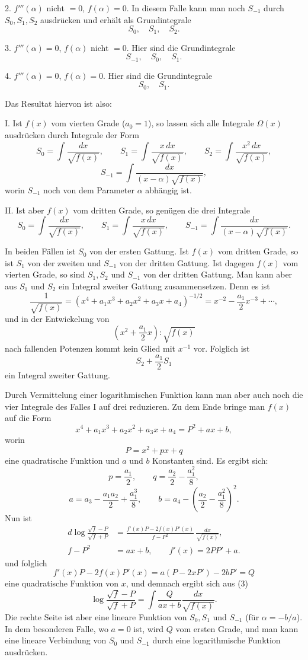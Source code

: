 \documentclass[11pt]{article}
\begin{document}
2. $f'''(\alpha)$ nicht $=0$, $f(\alpha)=0$. In diesem Falle kann man noch $S_{-1}$ durch $S_0,S_1,S_2$ ausdrücken und erhält als Grundintegrale
\[
S_0,\quad S_1,\quad S_2.
\]

3. $f'''(\alpha)=0$, $f(\alpha)$ nicht $=0$. Hier sind die Grundintegrale
\[
S_{-1},\quad S_0,\quad S_1.
\]

4. $f'''(\alpha)=0$, $f(\alpha)=0$. Hier sind die Grundintegrale
\[
S_0,\quad S_1.
\]

Das Resultat hiervon ist also:

I. Ist $f(x)$ vom vierten Grade ($a_0=1$), so lassen sich alle Integrale $\Omega(x)$ ausdrücken durch Integrale der Form
\[
S_0=\int\frac{dx}{\sqrt{f(x)}},\qquad
S_1=\int\frac{x\,dx}{\sqrt{f(x)}},\qquad
S_2=\int\frac{x^2\,dx}{\sqrt{f(x)}},
\]
\[
S_{-1}=\int\frac{dx}{(x-\alpha)\sqrt{f(x)}},
\]
worin $S_{-1}$ noch von dem Parameter $\alpha$ abhängig ist.

II. Ist aber $f(x)$ vom dritten Grade, so genügen die drei Integrale
\[
S_0=\int\frac{dx}{\sqrt{f(x)}},\qquad
S_1=\int\frac{x\,dx}{\sqrt{f(x)}},\qquad
S_{-1}=\int\frac{dx}{(x-\alpha)\sqrt{f(x)}}.
\]

In beiden Fällen ist $S_0$ von der ersten Gattung. Ist $f(x)$ vom dritten Grade, so ist $S_1$ von der zweiten und $S_{-1}$ von der dritten Gattung. Ist dagegen $f(x)$ vom vierten Grade, so sind $S_1,S_2$ und $S_{-1}$ von der dritten Gattung. Man kann aber aus $S_1$ und $S_2$ ein Integral zweiter Gattung zusammensetzen. Denn es ist
\[
\frac1{\sqrt{f(x)}}=(x^4+a_1x^3+a_2x^2+a_3x+a_4)^{-1/2}
=x^{-2}-\frac{a_1}{2}x^{-3}+\cdots,
\]
und in der Entwickelung von
\[
\left(x^2+\frac{a_1}{2}x\right):\sqrt{f(x)}
\]
nach fallenden Potenzen kommt kein Glied mit $x^{-1}$ vor. Folglich ist
\[
S_2+\frac{a_1}{2}S_1
\]
ein Integral zweiter Gattung.

Durch Vermittelung einer logarithmischen Funktion kann man aber auch noch die vier Integrale des Falles I auf drei reduzieren. Zu dem Ende bringe man $f(x)$ auf die Form
\[
x^4+a_1x^3+a_2x^2+a_3x+a_4=P^2+ax+b,
\]
worin
\[
P=x^2+px+q
\]
eine quadratische Funktion und $a$ und $b$ Konstanten sind. Es ergibt sich:
\[
p=\frac{a_1}{2},\qquad q=\frac{a_2}{2}-\frac{a_1^2}{8},
\]
\[
a=a_3-\frac{a_1a_2}{2}+\frac{a_1^3}{8},\qquad
b=a_4-\left(\frac{a_2}{2}-\frac{a_1^2}{8}\right)^2.
\]
Nun ist
\begin{equation}
\begin{aligned}
d\log\frac{\sqrt f-P}{\sqrt f+P}
&=
\frac{f'(x)P-2f(x)P'(x)}{f-P^2}\,
\frac{dx}{\sqrt{f(x)}},\\
f-P^2&=ax+b,\qquad f'(x)=2PP'+a.
\end{aligned}
\tag{3}
\end{equation}
und folglich
\[
f'(x)P-2f(x)P'(x)=a(P-2xP')-2bP'=Q
\]
eine quadratische Funktion von $x$, und demnach ergibt sich aus (3)
\begin{equation}
\log\frac{\sqrt f-P}{\sqrt f+P}
=
\int\frac{Q}{ax+b}\frac{dx}{\sqrt{f(x)}}.
\tag{4}
\end{equation}
Die rechte Seite ist aber eine lineare Funktion von $S_0,S_1$ und $S_{-1}$ (für $\alpha=-b/a$). In dem besonderen Falle, wo $a=0$ ist, wird $Q$ vom ersten Grade, und man kann eine lineare Verbindung von $S_0$ und $S_{-1}$ durch eine logarithmische Funktion ausdrücken.
\end{document}
